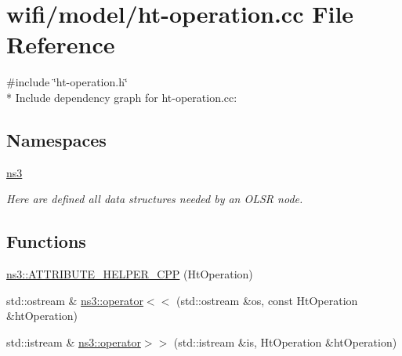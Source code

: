 \hypertarget{ht-operation_8cc}{}\section{wifi/model/ht-\/operation.cc File Reference}
\label{ht-operation_8cc}
{\ttfamily \#include \char`\"{}ht-\/operation.\+h\char`\"{}}\\*
Include dependency graph for ht-\/operation.cc\+:
\subsection*{Namespaces}
\begin{DoxyCompactItemize}
\item 
 \hyperlink{namespacens3}{ns3}
\begin{DoxyCompactList}\small\item\em Here are defined all data structures needed by an O\+L\+SR node. \end{DoxyCompactList}\end{DoxyCompactItemize}
\subsection*{Functions}
\begin{DoxyCompactItemize}
\item 
\hyperlink{namespacens3_a85f375cd2e828a126bd8611f77c5cbc4}{ns3\+::\+A\+T\+T\+R\+I\+B\+U\+T\+E\+\_\+\+H\+E\+L\+P\+E\+R\+\_\+\+C\+PP} (Ht\+Operation)
\item 
std\+::ostream \& \hyperlink{namespacens3_ae717a480741ca14507b3c209fae97878}{ns3\+::operator$<$$<$} (std\+::ostream \&os, const Ht\+Operation \&ht\+Operation)
\item 
std\+::istream \& \hyperlink{namespacens3_a9c588b04f777c3f6890b9709e7732afb}{ns3\+::operator$>$$>$} (std\+::istream \&is, Ht\+Operation \&ht\+Operation)
\end{DoxyCompactItemize}
